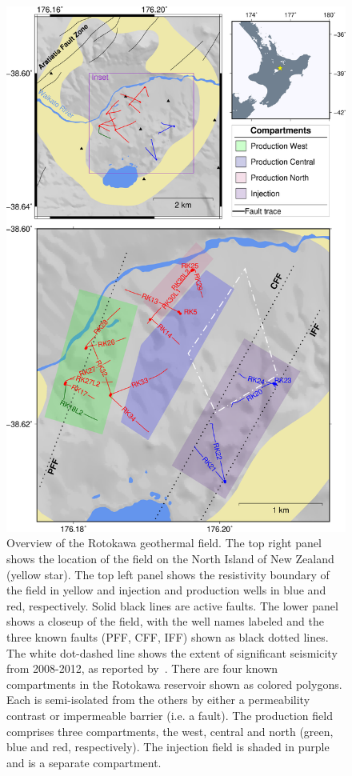 \begin{figure}[h!]
\begin{center}
\includegraphics[width=1.00\columnwidth]{Chapter_1_Intro/figures/Rotokawa_overview_Intro/merc_Rot_overview_struct_inset_NI_compartments_original}
\caption{{Overview of the Rotokawa geothermal field. The top right panel shows the
location of the field on the North Island of New Zealand (yellow star).
The top left panel shows the resistivity boundary of the field in yellow
and injection and production wells in blue and red, respectively. Solid
black lines are active faults. The lower panel shows a closeup of the
field, with the well names labeled and the three known faults (PFF, CFF,
IFF) shown as black dotted lines. The white dot-dashed line shows the
extent of significant seismicity from 2008-2012, as reported
by~\protect\citet{Sherburn_2015}. There are four known compartments in the Rotokawa
reservoir shown as colored polygons. Each is semi-isolated from the
others by either a permeability contrast or impermeable barrier (i.e. a
fault). The production field comprises three compartments, the west,
central and north (green, blue and red, respectively). The injection
field is shaded in purple and is a separate compartment.
{\label{838185}}%
}}
\end{center}
\end{figure}

